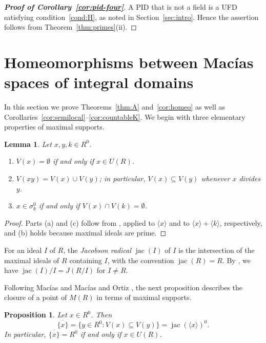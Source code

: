 \documentclass[12pt,reqno,a4paper]{amsart}
\newcommand{\clo}[1]{\overline{\{#1\}}}
\DeclareMathOperator{\jac}{jac}
\theoremstyle{plain}
\newtheorem{proposition}[theorem]{Proposition}
\newtheorem{lemma}[theorem]{Lemma}
\theoremstyle{definition}
\begin{document}
\begin{proof}[\normalfont\bfseries Proof of Corollary~\ref{cor:pid-four}]
A PID that is not a field is a UFD satisfying condition~\ref{cond:H}, as noted in Section~\ref{sec:intro}. Hence the assertion follows from Theorem~\ref{thm:primes}(ii).
\end{proof}

\section{Homeomorphisms between Mac\'ias spaces of integral domains}\label{sec:kolmogorov}

In this section we prove Theorems~\ref{thm:A} and~\ref{cor:homeo} as well as Corollaries~\ref{cor:semilocal}--\ref{cor:countableK}. We begin with three elementary properties of maximal supports.

\begin{lemma}\label{lem:V}
Let $x,y,k\in R^0$.
\begin{enumerate}[label=\textup{(\alph*)}]
\item $V(x)=\emptyset$ if and only if $x\in U(R)$.
\item $V(xy)=V(x)\cup V(y)$; in particular, $V(x)\subseteq V(y)$ whenever $x$ divides $y$.
\item $x\in\sigma_k^0$ if and only if $V(x)\cap V(k)=\emptyset$.
\end{enumerate}
\end{lemma}
\begin{proof}
Parts (a) and (c) follow from \cite[Corollary~1.4]{AtiyahMacdonald}, applied to $\langle x\rangle$ and to $\langle x\rangle+\langle k\rangle$, respectively, and (b) holds because maximal ideals are prime.
\end{proof}
For an ideal $I$ of $R$, the \emph{Jacobson radical} $\jac(I)$ of $I$ is the intersection of the maximal ideals of $R$ containing $I$, with the convention $\jac(R)=R$. By \cite[Proposition~1.1]{AtiyahMacdonald}, we have $\jac(I)/I=J(R/I)$ for $I\neq R$.

Following Mac\'ias \cite{MaciasDomains} and Mac\'ias and Ortiz \cite[Proposition~3.8]{MaciasOrtiz}, the next proposition describes the closure of a point of $M(R)$ in terms of maximal supports.
\begin{proposition}\label{prop:closure}
Let $x\in R^0$. Then
\[
\clo{x}=\{y\in R^0:V(x)\subseteq V(y)\}=\jac(\langle x\rangle)^0.
\]
In particular, $\clo{x}=R^0$ if and only if $x\in U(R)$.
\end{proposition}
\end{document}
